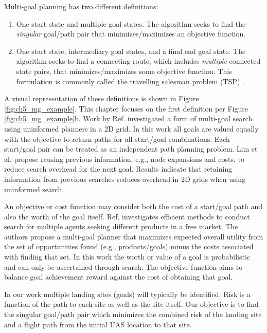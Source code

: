 Multi-goal planning has two different  definitions:
\begin{enumerate}
    \item One start state and multiple goal states. The algorithm seeks to find the \emph{singular} goal/path pair that minimizes/maximizes an objective function.
    \item One start state, intermediary goal states, and a final end goal state. The algorithm seeks to find a connecting route, which includes \emph{multiple} connected state pairs, that minimizes/maximizes some objective function. This formulation is commonly called the travelling salesman problem (TSP) \cite{saha_planning_2003}.
\end{enumerate}
A visual representation of these definitions is shown in Figure \ref{fig:ch5_mg_example}. This chapter focuses on the first definition per Figure \ref{fig:ch5_mg_example}b.  Work by Ref. \cite{lim_uninformed_2014} investigated a form of multi-goal search using uninformed planners in a 2D grid. In this work all goals are valued equally with the objective to return paths for all start/goal combinations. Each start/goal pair can be treated as an independent path planning problem. Lim et al. propose reusing previous information, e.g.,  node expansions and costs, to reduce search overhead for the next goal. Results indicate that retaining information from previous searches reduces overhead in 2D grids when using uninformed search.

An objective or cost function may consider both the cost of a start/goal path and also the worth of the goal itself. Ref. \cite{sarne_multi-goal_2010} investigates efficient methods to conduct search for multiple agents seeking different products in a free market.  The authors propose a multi-goal planner that maximizes expected overall utility from the set of opportunities found (e.g., products/goals) minus the costs associated with finding that set. In this work the worth or value of a goal is probabilistic and can only be ascertained through search. The objective function aims to balance goal achievement reward against the cost of obtaining that goal.

In our work multiple landing sites (goals) will typically be identified. Risk is a function of the path to each site as well as the site itself. Our objective is to find the singular goal/path pair which minimizes the combined risk of the landing site and a flight path from the initial \ac{UAS} location to that site. 

